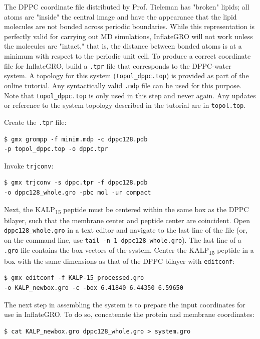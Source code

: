\documentclass[9pt,tutorial]{livecoms}
\begin{document}
The DPPC coordinate file distributed by Prof. Tieleman has "broken" lipids; all atoms are "inside" the central image and have the appearance that the lipid molecules are not bonded across periodic boundaries. While this representation is perfectly valid for carrying out MD simulations, InflateGRO will not work unless the molecules are "intact," that is, the distance between bonded atoms is at a minimum with respect to the periodic unit cell. To produce a correct coordinate file for InflateGRO, build a \texttt{.tpr} file that corresponds to the DPPC-water system. A topology for this system (\texttt{topol\_dppc.top}) is provided as part of the online tutorial. Any syntactically valid \texttt{.mdp} file can be used for this purpose. Note that \texttt{topol\_dppc.top} is only used in this step and never again. Any updates or reference to the system topology described in the tutorial are in \texttt{topol.top}.

Create the \texttt{.tpr} file:

\begin{verbatim}
$ gmx grompp -f minim.mdp -c dppc128.pdb 
-p topol_dppc.top -o dppc.tpr
\end{verbatim}

Invoke \texttt{trjconv}:

\begin{verbatim}
$ gmx trjconv -s dppc.tpr -f dppc128.pdb 
-o dppc128_whole.gro -pbc mol -ur compact
\end{verbatim}

Next, the KALP\textsubscript{15} peptide must be centered within the same box as the DPPC bilayer, such that the membrane center and peptide center are coincident. Open \texttt{dppc128\_whole.gro} in a text editor and navigate to the last line of the file (or, on the command line, use \texttt{tail -n 1 dppc128\_whole.gro}). The last line of a \texttt{.gro} file contains the box vectors of the system. Center the KALP\textsubscript{15} peptide in a box with the same dimensions as that of the DPPC bilayer with \texttt{editconf}:

\begin{verbatim}
$ gmx editconf -f KALP-15_processed.gro 
-o KALP_newbox.gro -c -box 6.41840 6.44350 6.59650
\end{verbatim}

The next step in assembling the system is to prepare the input coordinates for use in InflateGRO. To do so, concatenate the protein and membrane coordinates:

\begin{verbatim}
$ cat KALP_newbox.gro dppc128_whole.gro > system.gro
\end{verbatim}
\end{document}
